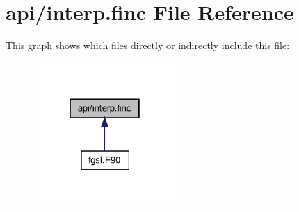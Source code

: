 \hypertarget{interp_8finc}{}\section{api/interp.finc File Reference}
\label{interp_8finc}
This graph shows which files directly or indirectly include this file\+:\nopagebreak
\begin{figure}[H]
\begin{center}
\leavevmode
\includegraphics[width=154pt]{interp_8finc__dep__incl}
\end{center}
\end{figure}
